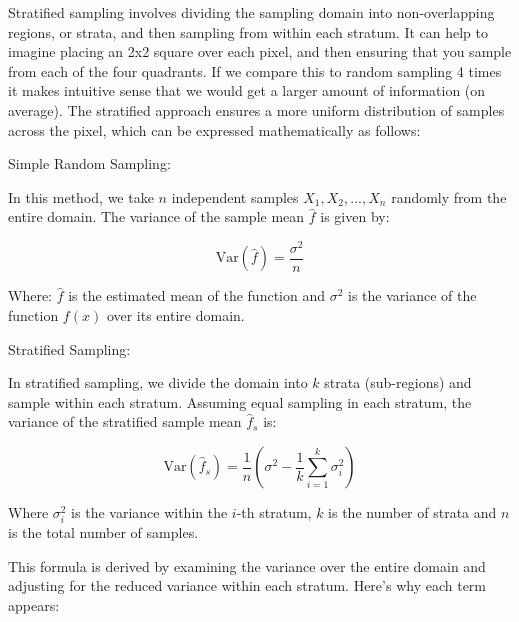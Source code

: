 \documentclass[12pt]{article}
\begin{document}
Stratified sampling involves dividing the sampling domain into non-overlapping regions, or strata, and then sampling from within each stratum. It can help to imagine placing an 2x2 square over each pixel, and then ensuring that you sample from each of the four quadrants. If we compare this to random sampling 4 times it makes intuitive sense that we would get a larger amount of information (on average).
The stratified approach ensures a more uniform distribution of samples across the pixel, which can be expressed mathematically as follows:

Simple Random Sampling:

In this method, we take $n$ independent samples $X_1, X_2, ..., X_n$ randomly from the entire domain. The variance of the sample mean $\hat{f}$ is given by:

\[
    \text{Var}(\hat{f}) = \frac{\sigma^2}{n}
\]

Where:
$\hat{f}$ is the estimated mean of the function and $\sigma^2$ is the variance of the function $f(x)$ over its entire domain.

Stratified Sampling:

In stratified sampling, we divide the domain into $k$ strata (sub-regions) and sample within each stratum. Assuming equal sampling in each stratum, the variance of the stratified sample mean $\hat{f}_s$ is:

\[
    \text{Var}(\hat{f}_s) = \frac{1}{n} \left( \sigma^2 - \frac{1}{k} \sum_{i=1}^k \sigma_i^2 \right)
\]

Where $\sigma_i^2$ is the variance within the $i$-th stratum, $k$ is the number of strata and $n$ is the total number of samples.

This formula is derived by examining the variance over the entire domain and adjusting for the reduced variance within each stratum. Here’s why each term appears:
\end{document}
